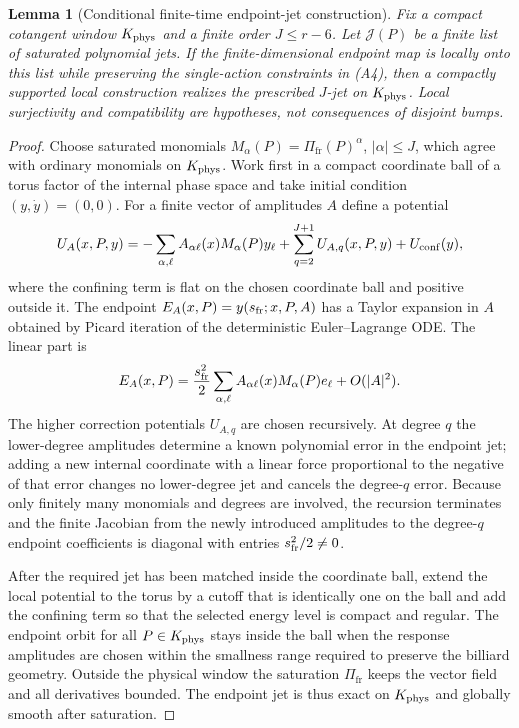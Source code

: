 \documentclass[12pt, letterpaper]{amsart}
\newcommand{\Pifr}{\Pi_{\mathrm{fr}}}
\theoremstyle{plain}
\newtheorem{lemma}[theorem]{Lemma}
\theoremstyle{definition}
\theoremstyle{remark}
\begin{document}
\begin{lemma}[Conditional finite-time endpoint-jet construction]
\label{lem:exact_endpoint_jet_compact_port}
Fix a compact cotangent window $K_{\rm phys}$ and a finite order $J\le r-6$.
Let $\mathcal J(P)$ be a finite list of saturated polynomial jets.  If the
finite-dimensional endpoint map is locally onto this list while preserving the
single-action constraints in \textup{(A4)}, then a compactly supported local
construction realizes the prescribed $J$-jet on $K_{\rm phys}$.  Local
surjectivity and compatibility are hypotheses, not consequences of disjoint
bumps.
\end{lemma}

\begin{proof}
Choose saturated monomials $M_\alpha(P)=\Pifr(P)^\alpha$, $|\alpha|\le J$,
which agree with ordinary monomials on $K_{\rm phys}$.  Work first in a compact
coordinate ball of a torus factor of the internal phase space and take initial
condition $(y,\dot y)=(0,0)$.  For a finite vector of amplitudes $A$ define a
potential
\begin{equation}
    U_A(x,P,y)=-\sum_{\alpha,\ell} A_{\alpha\ell}(x)M_\alpha(P)y_\ell
       +\sum_{q=2}^{J+1} U_{A,q}(x,P,y)+U_{\rm conf}(y),
\end{equation}
where the confining term is flat on the chosen coordinate ball and positive
outside it.  The endpoint $E_A(x,P)=y(s_{\rm fr};x,P,A)$ has a Taylor expansion
in $A$ obtained by Picard iteration of the deterministic Euler--Lagrange ODE.
The linear part is
\begin{equation}
    E_A(x,P)=\frac{s_{\rm fr}^2}{2}
      \sum_{\alpha,\ell}A_{\alpha\ell}(x)M_\alpha(P)e_\ell+O(|A|^2).
\end{equation}
The higher correction potentials $U_{A,q}$ are chosen recursively.  At degree
$q$ the lower-degree amplitudes determine a known polynomial error in the
endpoint jet; adding a new internal coordinate with a linear force proportional
to the negative of that error changes no lower-degree jet and cancels the
degree-$q$ error.  Because only finitely many monomials and degrees are involved,
the recursion terminates and the finite Jacobian from the newly introduced
amplitudes to the degree-$q$ endpoint coefficients is diagonal with entries
$s_{\rm fr}^2/2\ne0$.

After the required jet has been matched inside the coordinate ball, extend the
local potential to the torus by a cutoff that is identically one on the ball and
add the confining term so that the selected energy level is compact and regular.
The endpoint orbit for all $P\in K_{\rm phys}$ stays inside the ball when the
response amplitudes are chosen within the smallness range required to preserve
the billiard geometry.  Outside the physical window the saturation $\Pifr$ keeps
the vector field and all derivatives bounded.  The endpoint jet is thus exact on
$K_{\rm phys}$ and globally smooth after saturation.


\end{proof}
\end{document}
